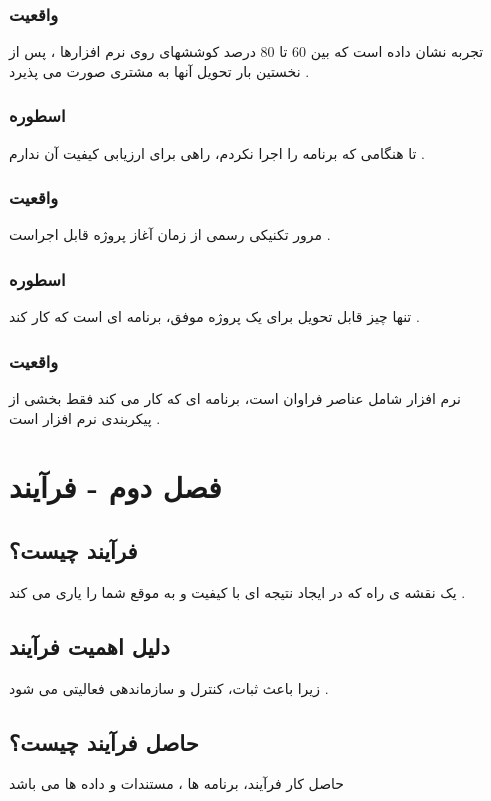 \documentclass{article}
\begin{document}
\subsubsection{واقعیت}
تجربه نشان داده است که بین 60 تا 80 درصد کوششهای روی نرم افزارها ، پس از نخستین بار تحویل آنها به مشتری صورت می پذیرد .

\subsubsection{اسطوره}
تا هنگامی که برنامه را اجرا نکردم، راهی برای ارزیابی کیفیت آن ندارم .


\subsubsection{واقعیت}
مرور تکنیکی رسمی از زمان آغاز پروژه قابل اجراست .



\subsubsection{اسطوره}
تنها چیز قابل تحویل برای یک پروژه موفق، برنامه ای است که کار کند .


\subsubsection{واقعیت}
نرم افزار شامل عناصر فراوان است، برنامه ای که کار می کند فقط بخشی از پیکربندی نرم افزار است .


\section{فصل دوم - فرآیند}


\subsection{فرآیند چیست؟}
یک نقشه ی راه که در ایجاد نتیجه ای با کیفیت و به موقع شما را یاری می کند .

\subsection{دلیل اهمیت فرآیند}
زیرا باعث ثبات، کنترل و سازماندهی فعالیتی می شود .


\subsection{حاصل فرآیند چیست؟}
حاصل کار فرآیند، برنامه ها ، مستندات و داده ها می باشد
\end{document}
